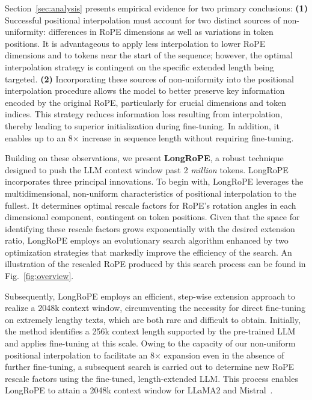 Section~\ref{sec:analysis} presents empirical evidence for two primary conclusions: \textbf{(1)} Successful positional interpolation must account for two distinct sources of non-uniformity: differences in RoPE dimensions as well as variations in token positions. It is advantageous to apply less interpolation to lower RoPE dimensions and to tokens near the start of the sequence; however, the optimal interpolation strategy is contingent on the specific extended length being targeted. 
  \textbf{(2)} Incorporating these sources of non-uniformity into the positional interpolation procedure allows the model to better preserve key information encoded by the original RoPE, particularly for crucial dimensions and token indices. This strategy reduces information loss resulting from interpolation, thereby leading to superior initialization during fine-tuning. In addition, it enables up to an 8$\times$ increase in sequence length without requiring fine-tuning.

Building on these observations, we present \textbf{LongRoPE}, a robust technique designed to push the LLM context window past 2 \emph{million} tokens. LongRoPE incorporates three principal innovations. To begin with, {LongRoPE} leverages the multidimensional, non-uniform characteristics of positional interpolation to the fullest. It determines optimal rescale factors for RoPE's rotation angles in each dimensional component, contingent on token positions. Given that the space for identifying these rescale factors grows exponentially with the desired extension ratio, {LongRoPE} employs an evolutionary search algorithm enhanced by two optimization strategies that markedly improve the efficiency of the search. An illustration of the rescaled RoPE produced by this search process can be found in Fig.~\ref{fig:overview}.

Subsequently, {LongRoPE} employs an efficient, step-wise extension approach to realize a 2048k context window, circumventing the necessity for direct fine-tuning on extremely lengthy texts, which are both rare and difficult to obtain. Initially, the method identifies a 256k context length supported by the pre-trained LLM and applies fine-tuning at this scale. Owing to the capacity of our non-uniform positional interpolation to facilitate an 8$\times$ expansion even in the absence of further fine-tuning, a subsequent search is carried out to determine new RoPE rescale factors using the fine-tuned, length-extended LLM. This process enables {LongRoPE} to attain a 2048k context window for LLaMA2 and Mistral~\cite{mistral}.

